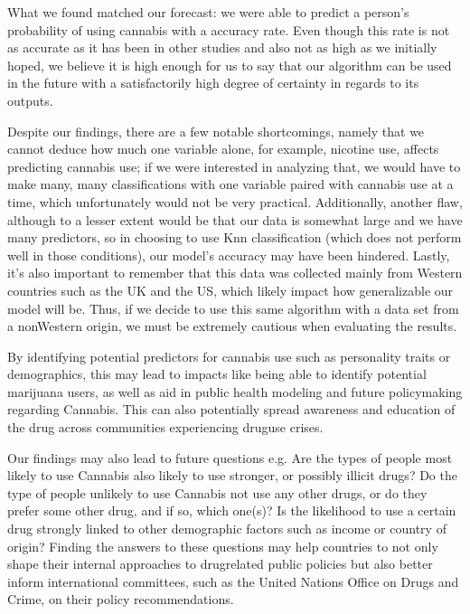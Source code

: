 \documentclass[letterpaper,10pt,english]{jupyterBook}
\begin{document}
\sphinxAtStartPar
What we found matched our forecast: we were able to predict a person’s probability of using cannabis with a  accuracy rate. Even though this rate is not as accurate as it has been in other studies and also not as high as we initially hoped, we believe it is high enough for us to say that our algorithm can be used in the future with a satisfactorily high degree of certainty in regards to its outputs.

\begin{DUlineblock}{0em}
\item[] 
\end{DUlineblock}

\sphinxAtStartPar
Despite our findings, there are a few notable shortcomings, namely that we cannot deduce how much one variable alone, for example, nicotine use, affects predicting cannabis use; if we were interested in analyzing that, we would have to make many, many classifications with one variable paired with cannabis use at a time, which unfortunately would not be very practical. Additionally, another flaw, although to a lesser extent would be that our data is somewhat large and we have many predictors, so in choosing to use K\sphinxhyphen{}nn classification (which does not perform well in those conditions), our model’s accuracy may have been hindered. Lastly, it’s also important to remember that this data was collected mainly from Western countries such as the UK and the US, which likely impact how generalizable our model will be. Thus, if we decide to use this same algorithm with a data set from a non\sphinxhyphen{}Western origin, we must be extremely cautious when evaluating the results.

\begin{DUlineblock}{0em}
\item[] 
\end{DUlineblock}

\sphinxAtStartPar
By identifying potential predictors for cannabis use such as personality traits or demographics, this may lead to impacts like being able to identify potential marijuana users, as well as aid in public health modeling and future policy\sphinxhyphen{}making regarding Cannabis. This can also potentially spread awareness and education of the drug across communities experiencing drug\sphinxhyphen{}use crises.

\sphinxAtStartPar
Our findings may also lead to future questions e.g. Are the types of people most likely to use Cannabis also likely to use stronger, or possibly illicit drugs? Do the type of people unlikely to use Cannabis not use any other drugs, or do they prefer some other drug, and if so, which one(s)? Is the likelihood to use a certain drug strongly linked to other demographic factors such as income or country of origin? Finding the answers to these questions may help countries to not only shape their internal approaches to drug\sphinxhyphen{}related public policies but also better inform international committees, such as the United Nations Office on Drugs and Crime, on their policy recommendations.
\end{document}
